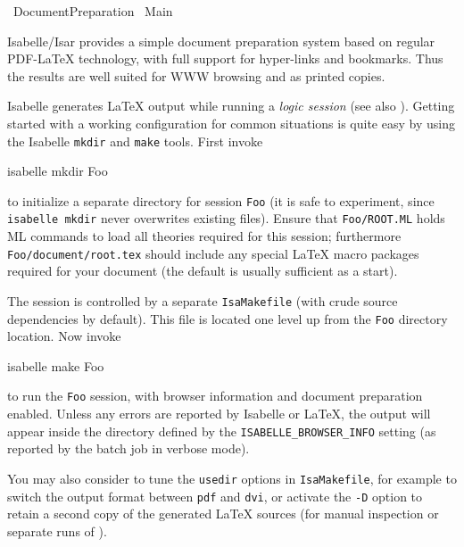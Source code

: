 %
\begin{isabellebody}%
\def\isabellecontext{Document{\isaliteral{5F}{\isacharunderscore}}Preparation}%
%
\isadelimtheory
%
\endisadelimtheory
%
\isatagtheory
{}\isamarkupfalse%
\ Document{}Preparation\isanewline
{}\ Main\isanewline
{}%
\endisatagtheory
{\isafoldtheory}%
%
\isadelimtheory
%
\endisadelimtheory
%
\isamarkuptrue%
%
\begin{isamarkuptext}%
Isabelle/Isar provides a simple document preparation system
  based on regular {PDF-\LaTeX} technology, with full support for
  hyper-links and bookmarks.  Thus the results are well suited for WWW
  browsing and as printed copies.

  \medskip Isabelle generates {\LaTeX} output while running a
  \emph{logic session} (see also \cite{isabelle-sys}).  Getting
  started with a working configuration for common situations is quite
  easy by using the Isabelle \verb|mkdir| and \verb|make|
  tools.  First invoke
\begin{ttbox}
  isabelle mkdir Foo
\end{ttbox}
  to initialize a separate directory for session \verb|Foo| (it
  is safe to experiment, since \verb|isabelle mkdir| never
  overwrites existing files).  Ensure that \verb|Foo/ROOT.ML|
  holds ML commands to load all theories required for this session;
  furthermore \verb|Foo/document/root.tex| should include any
  special {\LaTeX} macro packages required for your document (the
  default is usually sufficient as a start).

  The session is controlled by a separate \verb|IsaMakefile|
  (with crude source dependencies by default).  This file is located
  one level up from the \verb|Foo| directory location.  Now
  invoke
\begin{ttbox}
  isabelle make Foo
\end{ttbox}
  to run the \verb|Foo| session, with browser information and
  document preparation enabled.  Unless any errors are reported by
  Isabelle or {\LaTeX}, the output will appear inside the directory
  defined by the \verb|ISABELLE_BROWSER_INFO| setting (as
  reported by the batch job in verbose mode).

  \medskip You may also consider to tune the \verb|usedir|
  options in \verb|IsaMakefile|, for example to switch the output
  format between \verb|pdf| and \verb|dvi|, or activate the
  \verb|-D| option to retain a second copy of the generated
  {\LaTeX} sources (for manual inspection or separate runs of
  \hyperlink{executable.latex}{\mbox{}}).


\end{isamarkuptext}
\end{isabellebody}
